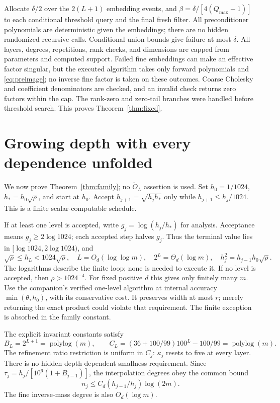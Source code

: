 \documentclass[11pt]{article}
\newcommand{\tO}{\widetilde O}
\begin{document}
Allocate \(\delta/2\) over the \(2(L+1)\) embedding events, and
\(\beta=\delta/[4(Q_{\max}+1)]\) to each conditional threshold query
and the final fresh filter. All preconditioner polynomials are deterministic
given the embeddings; there are no hidden randomized recursive calls.
Conditional union bounds give failure at most \(\delta\).
All layers, degrees, repetitions, rank checks, and dimensions are capped
from parameters and computed support. Failed fine embeddings can make
an effective factor singular, but the executed algorithm takes only
forward polynomials and \eqref{eq:preimage}; no inverse fine factor is
taken on these outcomes. Coarse Cholesky and coefficient denominators
are checked, and an invalid check returns zero factors within the cap.
The rank-zero and zero-tail branches were handled before threshold search.
This proves Theorem~\ref{thm:fixed}.

\section{Growing depth with every dependence unfolded}
We now prove Theorem~\ref{thm:family}; no \(\tO_L\) assertion is used.
Set \(h_0=1/1024\), \(h_*=h_0\sqrt\rho\), and start at \(h_0\).
Accept \(h_{j+1}=\sqrt{h_jh_*}\) only while
\(h_{j+1}\leq h_j/1024\). This is a finite scalar-computable schedule.

If at least one level is accepted, write \(g_j=\log(h_j/h_*)\) for
analysis. Acceptance means \(g_j\geq2\log1024\); each accepted step
halves \(g_j\). Thus the terminal value lies in
\([\log1024,2\log1024)\), and
\begin{equation}\label{eq:schedule}
 \sqrt\rho\leq h_L<1024\sqrt\rho,\quad
 L=O_d(\log\log m),\quad2^L=\Theta_d(\log m),\quad
 h_j^2=h_{j-1}h_0\sqrt\rho.
\end{equation}
The logarithms describe the finite loop; none is needed to execute it.
If no level is accepted, then \(\rho>1024^{-4}\). For fixed positive
\(d\) this gives only finitely many \(m\). Use the companion's verified
one-level algorithm at internal accuracy \(\min(\theta,h_0)\), with
its conservative cost. It preserves width at most \(r\); merely
returning the exact product could violate that requirement. The finite
exception is absorbed in the family constant.

The explicit invariant constants satisfy
\[
 B_L=2^{L+1}=\operatorname{polylog}(m),\qquad
 C_L=(36+100/99)100^L-100/99=\operatorname{polylog}(m).
\]
The refinement ratio restriction is uniform in \(C_j\): \(\kappa_j\)
resets to five at every layer. There is no hidden depth-dependent
smallness requirement. Since \(\tau_j=h_j/[10^6(1+B_{j-1})]\),
the interpolation degrees obey the common bound
\begin{equation}\label{eq:degreeuniform}
 n_j\leq C_d(h_{j-1}/h_j)\log(2m).
\end{equation}
The fine inverse-mass degree is also \(O_d(\log m)\).
\end{document}
